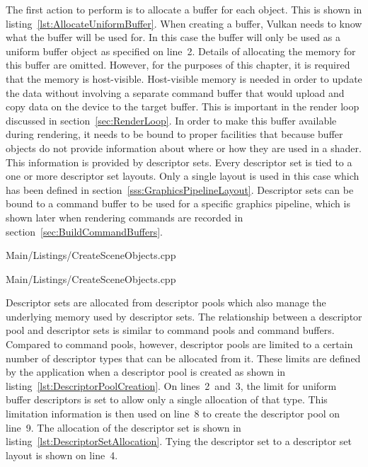         The first action to perform is to allocate a buffer for each object.
        This is shown in listing~\ref{lst:AllocateUniformBuffer}.
        When creating a buffer, Vulkan needs to know what the buffer will be used for.
        In this case the buffer will only be used as a uniform buffer object as specified on line~2.
        Details of allocating the memory for this buffer are omitted.
        However, for the purposes of this chapter, it is required that the memory is host-visible.
        Host-visible memory is needed in order to update the data without involving a separate command buffer that would upload and copy data on the device to the target buffer.
        This is important in the render loop discussed in section~\ref{sec:RenderLoop}.
        In order to make this buffer available during rendering, it needs to be bound to proper facilities that because buffer objects do not provide information about where or how they are used in a shader.
        This information is provided by descriptor sets.
        Every descriptor set is tied to a one or more descriptor set layouts.
        Only a single layout is used in this case which has been defined in section~\ref{sss:GraphicsPipelineLayout}.
        Descriptor sets can be bound to a command buffer to be used for a specific graphics pipeline, which is shown later when rendering commands are recorded in section~\ref{sec:BuildCommandBuffers}.

        
        {Main/Listings/CreateSceneObjects.cpp}

        
        {Main/Listings/CreateSceneObjects.cpp}

        Descriptor sets are allocated from descriptor pools which also manage the underlying memory used by descriptor sets.
        The relationship between a descriptor pool and descriptor sets is similar to command pools and command buffers.
        Compared to command pools, however, descriptor pools are limited to a certain number of descriptor types that can be allocated from it.
        These limits are defined by the application when a descriptor pool is created as shown in listing~\ref{lst:DescriptorPoolCreation}.
        On lines~2~and~3, the limit for uniform buffer descriptors is set to allow only a single allocation of that type.
        This limitation information is then used on line~8 to create the descriptor pool on line~9.
        The allocation of the descriptor set is shown in listing~\ref{lst:DescriptorSetAllocation}.
        Tying the descriptor set to a descriptor set layout is shown on line~4.


